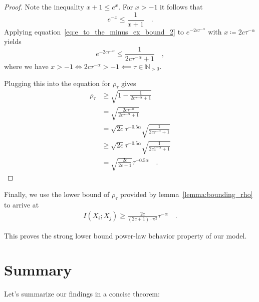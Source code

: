 \documentclass[../../main.tex]{subfiles}
\begin{document}
\begin{proof}
    Note the inequality $x + 1 \leq e^x$. For $x > -1$ it follows that
    \begin{equation}
        e^{-x} \leq \frac{1}{x + 1} \label{eq:e_to_the_minus_ex_bound_2} \quad .
    \end{equation}
    Applying equation~\ref{eq:e_to_the_minus_ex_bound_2} to $e^{-2c \tau^{-\alpha}}$ with $x \coloneqq 2c \tau^{-\alpha}$ yields
    \[
        e^{-2c \tau^{-\alpha}} \leq \frac{1}{2c \tau^{-\alpha} + 1} \quad ,
    \]
    where we have $x > -1 \iff 2c \tau^{-\alpha} > -1 \impliedby \tau \in \mathbb{N}_{>0}$.

    Plugging this into the equation for $\rho_\tau$ gives
    \begin{align*}
        \rho_\tau &\geq \sqrt{1 - \frac{1}{2c \tau^{-\alpha} + 1}} \\
        &= \sqrt{\frac{2c \tau^{-\alpha}}{2c \tau^{-\alpha} + 1}} \\
        &= \sqrt{2c} \tau^{-0.5\alpha} \sqrt{\frac{1}{2c \tau^{-\alpha} + 1}} \\
        &\geq \sqrt{2c} \tau^{-0.5\alpha} \sqrt{\frac{1}{2c 1^{-\alpha} + 1}} \\
        &= \sqrt{\frac{2c}{2c + 1}} \tau^{-0.5 \alpha} \quad .
    \end{align*}
\end{proof}

Finally, we use the lower bound of $\rho_\tau$ provided by lemma~\ref{lemma:bounding_rho} to arrive at
\begin{align*}
    I(X_i; X_j) \geq \frac{2c}{(2c + 1) \cdot \pi^2} \tau^{-\alpha} \quad .
\end{align*}

This proves the strong lower bound power-law behavior property of our model.

\pagebreak
\section{Summary}
Let's summarize our findings in a concise theorem:
\end{document}
